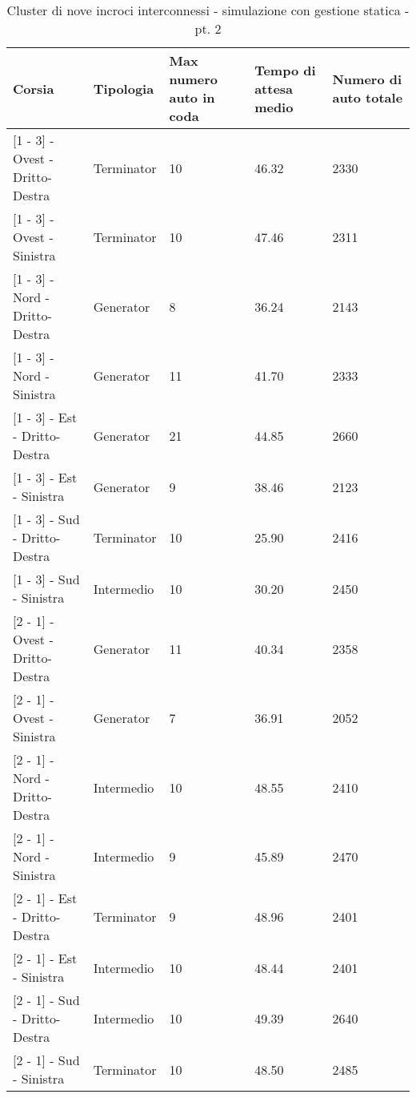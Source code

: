 \newpage
\begin{table}[H]
\centering
\begin{tabular}{|C{2cm}|C{2cm}|C{3cm}|C{3cm}|C{3cm}|}
\hline
\textbf{Corsia} &
\textbf{Tipologia} &
\textbf{Max numero auto in coda} &
\textbf{Tempo di attesa medio} &
\textbf{Numero di auto totale} \\\hline
\scriptsize{[1 - 3] - Ovest - Dritto-Destra} &
Terminator &
10 &
46.32 &
2330 \\\hline
\scriptsize{[1 - 3] - Ovest - Sinistra} &
Terminator &
10 &
47.46 &
2311 \\\hline
\scriptsize{[1 - 3] - Nord - Dritto-Destra} &
Generator &
8 &
36.24 &
2143 \\\hline
\scriptsize{[1 - 3] - Nord - Sinistra} &
Generator &
11 &
41.70 &
2333 \\\hline
\scriptsize{[1 - 3] - Est - Dritto-Destra} &
Generator &
21 &
44.85 &
2660 \\\hline
\scriptsize{[1 - 3] - Est - Sinistra} &
Generator &
9 &
38.46 &
2123 \\\hline
\scriptsize{[1 - 3] - Sud - Dritto-Destra} &
Terminator &
10 &
25.90 &
2416 \\\hline
\scriptsize{[1 - 3] - Sud - Sinistra} &
Intermedio &
10 &
30.20 &
2450 \\\hline
\scriptsize{[2 - 1] - Ovest - Dritto-Destra} &
Generator &
11 &
40.34 &
2358 \\\hline
\scriptsize{[2 - 1] - Ovest - Sinistra} &
Generator &
7 &
36.91 &
2052 \\\hline
\scriptsize{[2 - 1] - Nord - Dritto-Destra} &
Intermedio &
10 &
48.55 &
2410 \\\hline
\scriptsize{[2 - 1] - Nord - Sinistra} &
Intermedio &
9 &
45.89 &
2470 \\\hline
\scriptsize{[2 - 1] - Est - Dritto-Destra} &
Terminator &
9 &
48.96 &
2401 \\\hline
\scriptsize{[2 - 1] - Est - Sinistra} &
Intermedio &
10 &
48.44 &
2401 \\\hline
\scriptsize{[2 - 1] - Sud - Dritto-Destra} &
Intermedio &
10 &
49.39 &
2640 \\\hline
\scriptsize{[2 - 1] - Sud - Sinistra} &
Terminator &
10 &
48.50 &
2485 \\\hline
\end{tabular}
\caption{Cluster di nove incroci interconnessi - simulazione con gestione statica - pt. 2}
\label{table:keytable}
\end{table}
\newpage
